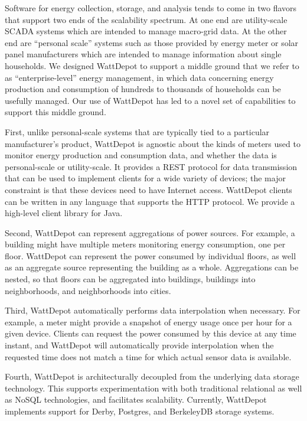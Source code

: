 \documentclass{acm_proc_article-sp}
\begin{document}
Software for energy collection, storage, and analysis tends to come in two flavors that
support two ends of the scalability spectrum.  At one end are utility-scale SCADA systems
which are intended to manage macro-grid data.  At the other end are ``personal scale''
systems such as those provided by energy meter or solar panel manufacturers which are
intended to manage information about single households.  We designed WattDepot to support
a middle ground that we refer to as ``enterprise-level'' energy management, in which data
concerning energy production and consumption of hundreds to thousands of households can be
usefully managed.  Our use of WattDepot has led to a novel set of capabilities to support
this middle ground.

First, unlike personal-scale systems that are typically tied to a particular
manufacturer's product, WattDepot is agnostic about the kinds of meters used to monitor
energy production and consumption data, and whether the data is personal-scale or
utility-scale. It provides a REST protocol for data transmission that can be used to
implement clients for a wide variety of devices; the major constraint is that these
devices need to have Internet access. WattDepot clients can be written in any language
that supports the HTTP protocol. We provide a high-level client library for Java.

Second, WattDepot can represent aggregations of power sou\-rces. For example, a building
might have multiple meters monitoring energy consumption, one per floor. WattDepot can
represent the power consumed by individual floors, as well as an aggregate source
representing the building as a whole. Aggregations can be nested, so that floors can be
aggregated into buildings, buildings into neighborhoods, and neighborhoods into cities.

Third, WattDepot automatically performs data interpolation when necessary. For example, a
meter might provide a snapshot of energy usage once per hour for a given device. Clients
can request the power consumed by this device at any time instant, and WattDepot will
automatically provide interpolation when the requested time does not match a time for
which actual sensor data is available.

Fourth, WattDepot is architecturally decoupled from the underlying data storage
technology. This supports experimentation with both traditional relational as well as
NoSQL technologies, and facilitates scalability. Currently, WattDepot implements support
for Derby, Postgres, and BerkeleyDB storage systems.
\end{document}
